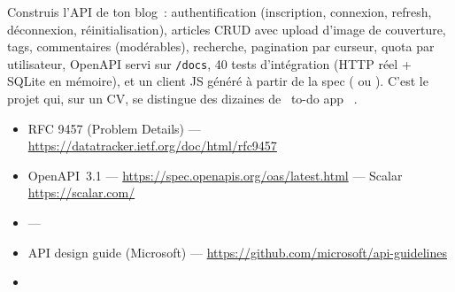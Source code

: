 \begin{projet}
Construis l'API de ton blog~: authentification (inscription, connexion, refresh, d\'econnexion,
r\'einitialisation), articles CRUD avec upload d'image de couverture, tags, commentaires
(mod\'erables), recherche, pagination par curseur, quota par utilisateur, OpenAPI servi sur
\verb|/docs|, 40 tests d'int\'egration (HTTP r\'eel + SQLite en m\'emoire), et un client JS g\'en\'er\'e
\`a partir de la spec (
ou ). C'est le projet qui, sur un CV, se
distingue des dizaines de \og ~to-do app~ \fg{}.
\end{projet}

\begin{ressources}
\begin{itemize}
  \item RFC 9457 (Problem Details) --- \url{https://datatracker.ietf.org/doc/html/rfc9457}
  \item OpenAPI~3.1 --- \url{https://spec.openapis.org/oas/latest.html} --- Scalar \url{https://scalar.com/}
  \item {} --- 
  \item API design guide (Microsoft) --- \url{https://github.com/microsoft/api-guidelines}
  \item {}
\end{itemize}
\end{ressources}

